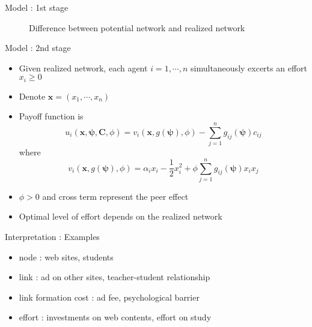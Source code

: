 \documentclass[10pt,dvipdfmx]{beamer}
\begin{document}
\begin{frame}{Model : 1st stage}
\begin{figure}[h]
{}
\caption{Difference between potential network and realized network}
\end{figure}
\end{frame}

\begin{frame}{Model : 2nd stage}
\begin{itemize}
    \item Given realized network, each agent $i = 1, \cdots, n$ simultaneously excerts an effort $x_i \ge 0$
    \item Denote $\bm{x} = (x_1, \cdots, x_n)$
    \item Payoff function is
        \[ u_i(\bm{x}, \bm{\psi}, \bm{C}, \phi) = v_i(\bm{x}, g(\bm{\psi}), \phi) - \sum_{j=1}^n g_{ij}(\bm{\psi}) c_{ij} \]
        where
        \[ v_i(\bm{x}, g(\bm{\psi}), \phi) = \alpha_i x_i - \frac{1}{2} x_i^2 + \phi \sum_{j=1}^n g_{ij}(\bm{\psi}) x_i x_j \]
    \item $\phi > 0$ and cross term represent the peer effect
    \item Optimal level of effort depends on the realized network
\end{itemize}
\end{frame}

\begin{frame}{Interpretation : Examples}
\begin{itemize}
    \item node : web sites, students
    \item link : ad on other sites, teacher-student relationship
    \item link formation cost : ad fee, psychological barrier
    \item effort : investments on web contents, effort on study
\end{itemize}
\end{frame}
\end{document}
